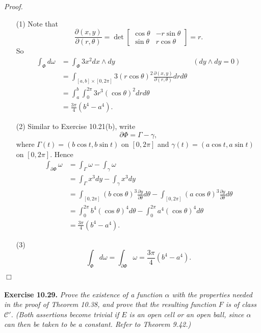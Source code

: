 \documentclass{article}
\begin{document}
\emph{Proof.}
\begin{enumerate}
\item[(1)]
  Note that
  \[
    \frac{\partial(x,y)}{\partial(r,\theta)}
    =
    \det
    \begin{bmatrix}
      \cos\theta & -r\sin\theta \\
      \sin\theta & r\cos\theta
    \end{bmatrix}
    = r.
  \]
  So
  \begin{align*}
    \int_{\Phi} d\omega
    &= \int_{\Phi} 3x^2 dx \wedge dy
      &(dy \wedge dy = 0) \\
    &= \int_{[a,b]\times[0,2\pi]} 3(r\cos\theta)^2
      \frac{\partial(x,y)}{\partial(r,\theta)} dr d\theta \\
    &= \int_{a}^{b} \int_{0}^{2\pi} 3 r^3 (\cos\theta)^2 dr d\theta \\
    &= \frac{3\pi}{4}(b^4-a^4).
  \end{align*}

\item[(2)]
  Similar to Exercise 10.21(b),
  write
  \[
    \partial \Phi = \Gamma - \gamma,
  \]
  where $\Gamma(t) = (b\cos t,b\sin t)$ on $[0,2\pi]$
  and $\gamma(t) = (a\cos t,a\sin t)$ on $[0,2\pi]$.
  Hence
  \begin{align*}
    \int_{\partial\Phi} \omega
    &= \int_{\Gamma} \omega - \int_{\gamma} \omega \\
    &= \int_{\Gamma} x^3 dy - \int_{\gamma} x^3 dy \\
    &= \int_{[0,2\pi]} (b\cos\theta)^3 \frac{\partial y}{\partial \theta}d\theta
      - \int_{[0,2\pi]} (a\cos\theta)^3 \frac{\partial y}{\partial \theta}d\theta \\
    &= \int_{0}^{2\pi} b^4 (\cos\theta)^4 d\theta
      - \int_{0}^{2\pi} a^4 (\cos\theta)^4 d\theta \\
    &= \frac{3\pi}{4}(b^4-a^4).
  \end{align*}

\item[(3)]
  \[
    \int_{\Phi} d\omega
    = \int_{\partial\Phi} \omega
    = \frac{3\pi}{4}(b^4-a^4).
  \]
\end{enumerate}
$\Box$ \\\\






\textbf{Exercise 10.29.}
\emph{Prove the existence of a function $\alpha$
with the properties needed in the proof of Theorem 10.38,
and prove that the resulting function $F$ is of class $\mathscr{C}'$.
(Both assertions become trivial if $E$ is an open cell or an open ball,
since $\alpha$ can then be taken to be a constant.
Refer to Theorem 9.42.)} \\
\end{document}
